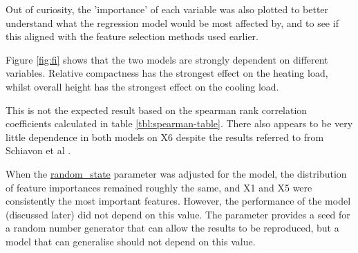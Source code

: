 \documentclass[12pt]{article}
\begin{document}
Out of curiosity, the 'importance' of each variable was also plotted to better understand what the regression model would be most affected by, and to see if this aligned with the feature selection methods used earlier.

Figure \ref{fig:fi} shows that the two models are strongly dependent on different variables. Relative compactness has the strongest effect on the heating load, whilst overall height has the strongest effect on the cooling load.

This is not the expected result based on the spearman rank correlation coefficients calculated in table \ref{tbl:spearman-table}. There also appears to be very little dependence in both models on X6 despite the results referred to from Schiavon et al \cite{schiavon_lee_bauman_webster_2010}.

When the \url{random_state} parameter was adjusted for the model, the distribution of feature importances remained roughly the same, and X1 and X5 were consistently the most important features. However, the performance of the model (discussed later) did not depend on this value. The parameter provides a seed for a random number generator that can allow the results to be reproduced, but a model that can generalise should not depend on this value.
\end{document}
